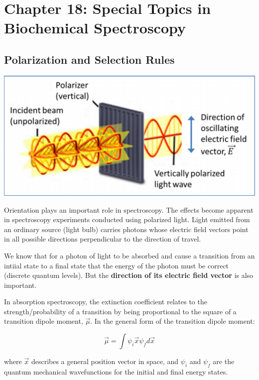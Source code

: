 \documentclass[12pt, letterpaper]{article}
\begin{document}
\newpage

\section*{Chapter 18: Special Topics in Biochemical Spectroscopy}
\subsection*{Polarization and Selection Rules}

\begin{center}
    \includegraphics[scale = 0.5]{spectroscopy.png}
\end{center}

Orientation plays an important role in spectroscopy. The effects become apparent in spectroscopy experiments conducted using polarized light. Light emitted from an ordinary source (light bulb)
carries photons whose electric field vectors point in all possible directions perpendicular to the direction of travel. 

We know that for a photon of light to be absorbed and cause a transition from an intiial state to a final state that the energy of the photon must be correct (discrete quantum levels). 
But the \textbf{direction of its electric field vector} is also important. 

In absorption spectroscopy, the extinction coefficient relates to the strength/probability of a transition by being proportional to the square of a transition dipole moment, $\stackrel{\rightarrow} \mu$.
In the general form of the transition dipole moment: 

\begin{equation*}
    \stackrel{\rightarrow} \mu = \int \psi_i \stackrel{\rightarrow} x \psi_f  d\stackrel{\rightarrow}x
\end{equation*}

where $\stackrel{\rightarrow} x $ describes a general position vector in space, and $\psi_i$ and $\psi_f$ are the quantum mechanical wavefunctions for the initial and final energy states. 
\end{document}
